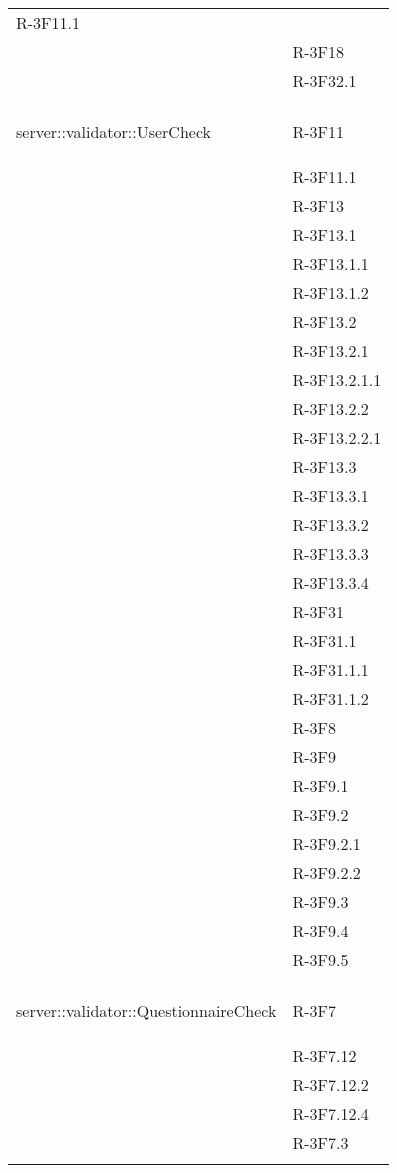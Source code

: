 \begin{longtable}{l p{3cm}}
R-3F11.1 \tabularnewline &

R-3F18 \tabularnewline &

R-3F32.1 \tabularnewline &\tabularnewline
\midrule
\hypertarget{server::validator::UserCheck}{server::validator::UserCheck} & R-3F11 \tabularnewline &

R-3F11.1 \tabularnewline &

R-3F13 \tabularnewline &

R-3F13.1 \tabularnewline &

R-3F13.1.1 \tabularnewline &

R-3F13.1.2 \tabularnewline &

R-3F13.2 \tabularnewline &

R-3F13.2.1 \tabularnewline &

R-3F13.2.1.1 \tabularnewline &

R-3F13.2.2 \tabularnewline &

R-3F13.2.2.1 \tabularnewline &

R-3F13.3 \tabularnewline &

R-3F13.3.1 \tabularnewline &

R-3F13.3.2 \tabularnewline &

R-3F13.3.3 \tabularnewline &

R-3F13.3.4 \tabularnewline &

R-3F31 \tabularnewline &

R-3F31.1 \tabularnewline &

R-3F31.1.1 \tabularnewline &

R-3F31.1.2 \tabularnewline &

R-3F8 \tabularnewline &

R-3F9 \tabularnewline &

R-3F9.1 \tabularnewline &

R-3F9.2 \tabularnewline &

R-3F9.2.1 \tabularnewline &

R-3F9.2.2 \tabularnewline &

R-3F9.3 \tabularnewline &

R-3F9.4 \tabularnewline &

R-3F9.5 \tabularnewline &\tabularnewline
\midrule
\hypertarget{server::validator::QuestionnaireCheck}{server::validator::QuestionnaireCheck} & R-3F7 \tabularnewline &

R-3F7.12 \tabularnewline &

R-3F7.12.2 \tabularnewline &

R-3F7.12.4 \tabularnewline &

R-3F7.3 \tabularnewline &


\end{longtable}
